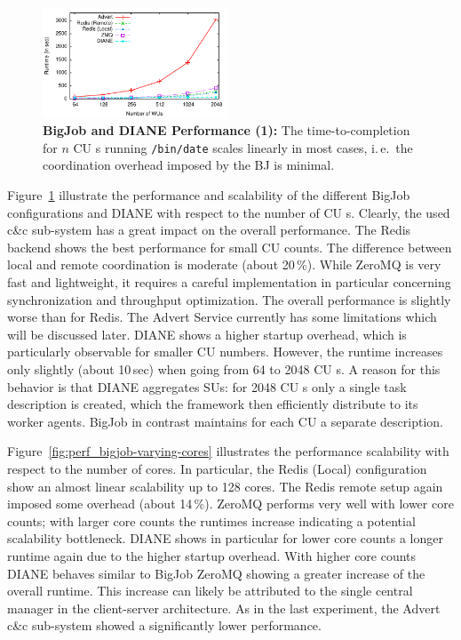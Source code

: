 \documentclass[conference,final]{IEEEtran}
\newcommand{\cu}{CU\xspace}
\newcommand{\upp}{\vspace*{-0.5em}}
\begin{document}
\begin{figure}[htbp] \centering
\includegraphics[width=0.49\textwidth]{perf/bigjob-varying-wus-alamo.pdf}
\caption{\textbf{BigJob and DIANE Performance (1):} The 
time-to-completion for $n$ \cu s running \texttt{/bin/date} scales linearly
in most cases, i.\,e.\ the coordination overhead imposed by the BJ is 
minimal.\upp\upp}
\label{fig:perf_bigjob-varying-wus} \end{figure}

Figure~\ref{fig:perf_bigjob-varying-wus} illustrate the performance and
scalability of the different BigJob configurations and DIANE with respect to the
number of \cu s. Clearly, the used c\&c sub-system has a great impact on the
overall performance. The Redis backend shows the best performance for small \cu 
counts. The difference between local and remote coordination is moderate (about
20\,\%). While ZeroMQ is very fast and lightweight, it requires a careful
implementation in particular concerning synchronization and throughput
optimization. The overall performance is slightly worse than for Redis. The
Advert Service currently has some limitations which will be discussed later.
DIANE shows a higher startup overhead, which is particularly observable for
smaller \cu  numbers. However, the runtime increases only slightly (about 10\,sec)
when going from 64 to 2048 \cu s. A reason for this behavior is that DIANE
aggregates SUs: for 2048 \cu s only a single task description is created, which
the framework then efficiently distribute to its worker agents. BigJob in
contrast maintains for each \cu  a separate description. 

Figure~\ref{fig:perf_bigjob-varying-cores} illustrates the performance
scalability with respect to the number of cores. In particular, the Redis
(Local) configuration show an almost linear scalability up to 128 cores. The
Redis remote setup again imposed some overhead (about 14\,\%). ZeroMQ performs
very well with lower core counts; with larger core counts the runtimes increase
indicating a potential scalability bottleneck. DIANE shows in particular for
lower core counts a longer runtime again due to the higher startup overhead.
With higher core counts DIANE behaves similar to BigJob ZeroMQ showing a greater
increase of the overall runtime. This increase can likely be attributed to
the single central manager in the client-server architecture. As in the last
experiment, the Advert c\&c sub-system showed a significantly lower performance.
\end{document}
